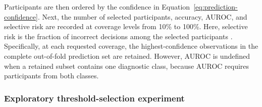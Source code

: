 Participants are then ordered by the confidence in Equation~\eqref{eq:prediction-confidence}. Next, the number
of selected participants, accuracy, AUROC, and selective risk are recorded at coverage
levels from 10\% to 100\%. Here, selective risk is the fraction of incorrect decisions
among the selected participants \citep{GeifmanElYaniv2017}. Specifically, at each requested
coverage, the highest-confidence observations in the complete out-of-fold prediction set
are retained. However, AUROC is undefined when a retained subset contains one diagnostic
class, because AUROC requires participants from both classes.

\subsubsection{Exploratory threshold-selection experiment}
\label{subsubsec:threshold-analysis}

